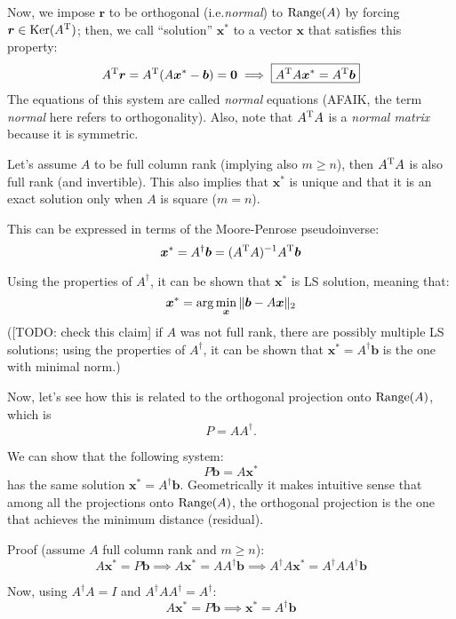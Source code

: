\documentclass[
  12pt,
  paper=a4,
]{scrartcl} %
\begin{document}
Now, we impose $\bm r$ to be orthogonal (i.e.\@ \emph{normal}) to $\operatorname{Range}(A)$ by forcing $\bm r\in \operatorname{Ker}(A^{\mathrm{T}})$; then, we call ``solution'' $\bm x^*$ to a vector $\bm x$ that satisfies this property:
\[ A^{\mathrm{T}} \bm r =
A^{\mathrm{T}} (A\bm x^*-\bm b) = \bm 0
\implies
\boxed{A^{\mathrm{T}} A\bm x^* = A^{\mathrm{T}} \bm b}
\]
The equations of this system are called \emph{normal} equations (AFAIK, the term \emph{normal} here refers to orthogonality). Also, note that $A^{\mathrm{T}} A$ is a \emph{normal matrix} because it is symmetric.

Let's assume $A$ to be full column rank (implying also $m\ge n$), then $A^{\mathrm{T}} A$ is also full rank (and invertible). This also implies that $\bm x^*$ is unique and that it is an exact solution only when $A$ is square ($m=n$).

This can be expressed in terms of the Moore-Penrose pseudoinverse:
\[
\bm x^* = A^\dagger \bm b = (A^{\mathrm{T}} A)^{-1}A^{\mathrm{T}} \bm b
\]

Using the properties of $A^\dagger$, it can be shown that $\bm x^*$ is LS solution, meaning that:
\[
\bm x^* = \arg\min_{\bm x} \|\bm b - A\bm x\|_2
\]
([TODO: check this claim] if $A$ was not full rank, there are possibly multiple LS solutions; using the properties of $A^\dagger$, it can be shown that $\bm x^*=A^\dagger \bm b$ is the one with minimal norm.)

Now, let's see how this is related to the orthogonal projection onto $\operatorname{Range} (A)$, which is \[P=AA^{\dagger}.\]





We can show that the following system:
\[
P\bm b = A\bm x^*
\]
has the same solution $\bm x^* = A^\dagger\bm b$. Geometrically it makes intuitive sense that among all the projections onto $\operatorname{Range}(A)$, the orthogonal projection is the one that achieves the minimum distance (residual).

Proof (assume $A$ full column rank and $m\ge n$):
\[
A\bm x^* = P\bm b
\implies
A\bm x^* = AA^\dagger \bm b
\implies
A^\dagger A\bm x^* = A^\dagger AA^\dagger \bm b
\]

Now, using $A^\dagger A=I$ and $A^\dagger AA^\dagger = A^\dagger$:
\[
A\bm x^* = P\bm b
\implies
\boxed{\bm x^* = A^\dagger \bm b}
\]
\end{document}
